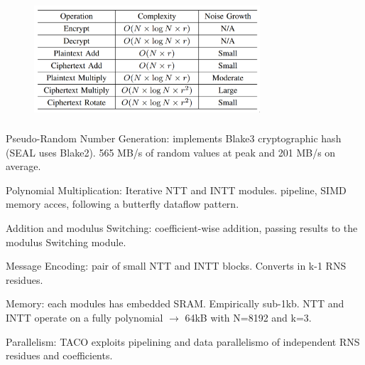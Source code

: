 \documentclass[10pt,handout]{beamer}
\begin{document}
\begin{frame}[noframenumbering]
\frametitle{}
\begin{figure}
    \includegraphics[width=0.75\textwidth]{complexity.png}
\end{figure}

\end{frame}

\begin{frame}[noframenumbering]
\frametitle{}
    Pseudo-Random Number Generation: implements Blake3 cryptographic hash (SEAL uses Blake2).
    565 MB/s of random values at peak and 201 MB/s on average.

    Polynomial Multiplication: Iterative NTT and INTT modules. pipeline, SIMD memory acces, following a
    butterfly dataflow pattern.

    Addition and modulus Switching: coefficient-wise addition, passing results to the modulus Switching module.

    Message Encoding: pair of small NTT and INTT blocks. Converts in k-1 RNS residues.

    Memory: each modules has embedded SRAM. Empirically sub-1kb. NTT and INTT operate on a fully
    polynomial $\rightarrow$ 64kB with N=8192 and k=3.

    Parallelism: TACO exploits pipelining and data parallelismo of independent RNS residues and coefficients.


\end{frame}
\end{document}
